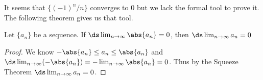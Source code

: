 It seems that  %
$\{(-1)^n/n\}$ converges to 0 but we lack the formal tool to prove it. The following theorem gives us that tool.

\begin{theorem}\label{thm:abs_val_seq}
Let $\{a_n\}$ be a sequence. If $\ds \lim_{n\to\infty}\abs{a_n}= 0$, then $\ds \lim_{n\to\infty} a_n = 0$
\end{theorem}

\begin{proof}
We know $-\abs{a_n}\leq a_n\leq\abs{a_n}$ and $\ds \lim_{n\to \infty} (-\abs{a_n})=-\lim_{n\to\infty}\abs{a_n}=0$. Thus by the Squeeze Theorem $\ds \lim_{n\to\infty} a_n =0$.
\end{proof}

